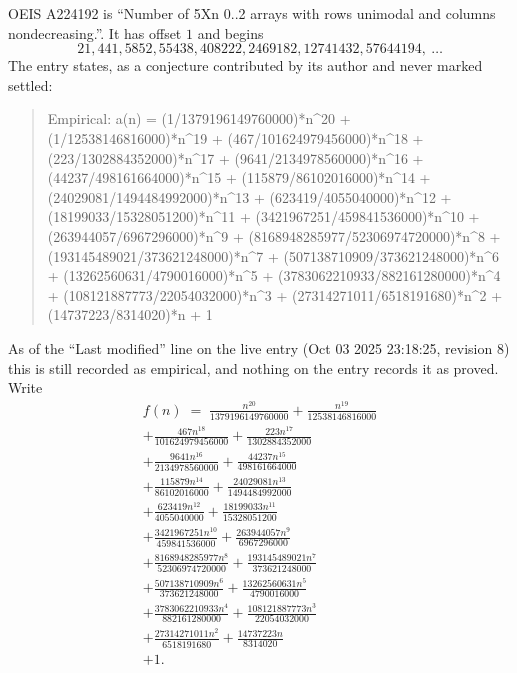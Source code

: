 \documentclass[11pt,a4paper]{article}
\theoremstyle{plain}
\theoremstyle{definition}
\begin{document}
OEIS A224192 is ``Number of 5Xn 0..2 arrays with rows unimodal and columns nondecreasing.''. It has offset $1$ and begins
\[
21, 441, 5852, 55438, 408222, 2469182, 12741432, 57644194,\ \dots
\]
The entry states, as a conjecture contributed by its author and never marked settled:
\begin{quote}\raggedright\small
Empirical: a(n) = (1/1379196149760000)*n\^{}20 + (1/12538146816000)*n\^{}19 + (467/101624979456000)*n\^{}18 + (223/1302884352000)*n\^{}17 + (9641/2134978560000)*n\^{}16 + (44237/498161664000)*n\^{}15 + (115879/86102016000)*n\^{}14 + (24029081/1494484992000)*n\^{}13 + (623419/4055040000)*n\^{}12 + (18199033/15328051200)*n\^{}11 + (3421967251/459841536000)*n\^{}10 + (263944057/6967296000)*n\^{}9 + (8168948285977/52306974720000)*n\^{}8 + (193145489021/373621248000)*n\^{}7 + (507138710909/373621248000)*n\^{}6 + (13262560631/4790016000)*n\^{}5 + (3783062210933/882161280000)*n\^{}4 + (108121887773/22054032000)*n\^{}3 + (27314271011/6518191680)*n\^{}2 + (14737223/8314020)*n + 1
\end{quote}
As of the ``Last modified'' line on the live entry (Oct 03 2025 23:18:25, revision 8) this is still
recorded as empirical, and nothing on the entry records it as proved. Write
\begin{multline*}
f(n)\;=\;\frac{n^{20}}{1379196149760000} + \frac{n^{19}}{12538146816000} \\
+ \frac{467 n^{18}}{101624979456000} + \frac{223 n^{17}}{1302884352000} \\
+ \frac{9641 n^{16}}{2134978560000} + \frac{44237 n^{15}}{498161664000} \\
+ \frac{115879 n^{14}}{86102016000} + \frac{24029081 n^{13}}{1494484992000} \\
+ \frac{623419 n^{12}}{4055040000} + \frac{18199033 n^{11}}{15328051200} \\
+ \frac{3421967251 n^{10}}{459841536000} + \frac{263944057 n^{9}}{6967296000} \\
+ \frac{8168948285977 n^{8}}{52306974720000} + \frac{193145489021 n^{7}}{373621248000} \\
+ \frac{507138710909 n^{6}}{373621248000} + \frac{13262560631 n^{5}}{4790016000} \\
+ \frac{3783062210933 n^{4}}{882161280000} + \frac{108121887773 n^{3}}{22054032000} \\
+ \frac{27314271011 n^{2}}{6518191680} + \frac{14737223 n}{8314020} \\
+ 1.
\end{multline*}
\end{document}
